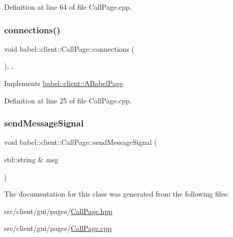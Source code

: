 Definition at line 64 of file Call\+Page.\+cpp.

\mbox{\label{classbabel_1_1client_1_1_call_page_af870c94b659fbdeab276b59f61bf3008}} 
\subsubsection{\texorpdfstring{connections()}{connections()}}
{\footnotesize\ttfamily void babel\+::client\+::\+Call\+Page\+::connections (\begin{DoxyParamCaption}{ }\end{DoxyParamCaption})\hspace{0.3cm}{\ttfamily [override]}, {\ttfamily [protected]}, {\ttfamily [virtual]}}



Implements \mbox{\hyperlink{classbabel_1_1client_1_1_a_babel_page_a37097dfd8ded982074554509e5eab8b0}{babel\+::client\+::\+A\+Babel\+Page}}.



Definition at line 25 of file Call\+Page.\+cpp.

\mbox{\label{classbabel_1_1client_1_1_call_page_a4019f93ce9b26918fe4dfe91399d2b38}} 
\subsubsection{\texorpdfstring{send\+Message\+Signal}{sendMessageSignal}}
{\footnotesize\ttfamily void babel\+::client\+::\+Call\+Page\+::send\+Message\+Signal (\begin{DoxyParamCaption}\item[{std\+::string \&}]{msg }\end{DoxyParamCaption})\hspace{0.3cm}{\ttfamily [signal]}}



The documentation for this class was generated from the following files\+:\begin{DoxyCompactItemize}
\item 
src/client/gui/pages/\mbox{\hyperlink{_call_page_8hpp}{Call\+Page.\+hpp}}\item 
src/client/gui/pages/\mbox{\hyperlink{_call_page_8cpp}{Call\+Page.\+cpp}}\end{DoxyCompactItemize}
